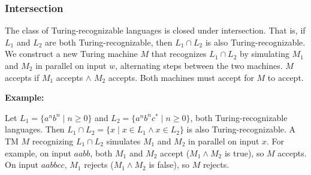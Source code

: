 \documentclass[12pt,a4paper,openany]{article}
\begin{document}
\begin{center}
\end{center}

\subsubsection{Intersection}

The class of Turing-recognizable languages is closed under intersection. That is, if $L_1$ and $L_2$ are both Turing-recognizable, then $L_1 \cap L_2$ is also Turing-recognizable. 
We construct a new Turing machine $M$ that recognizes $L_1 \cap L_2$ by simulating $M_1$ and $M_2$ in parallel on input $w$, alternating steps between the two machines. 
$M$ accepts if $M_1$ accepts $\land$ $M_2$ accepts. Both machines must accept for $M$ to accept.

\textbf{Example:}

Let $L_1 = \{a^n b^n \mid n \geq 0\}$ and $L_2 = \{a^n b^n c^* \mid n \geq 0\}$, both Turing-recognizable languages. Then $L_1 \cap L_2 = \{x \mid x \in L_1 \land x \in L_2\}$ is also Turing-recognizable. A TM $M$ recognizing $L_1 \cap L_2$ simulates $M_1$ and $M_2$ in parallel on input $x$. For example, on input $aabb$, both $M_1$ and $M_2$ accept ($M_1 \land M_2$ is true), so $M$ accepts. On input $aabbcc$, $M_1$ rejects ($M_1 \land M_2$ is false), so $M$ rejects.
\end{document}
